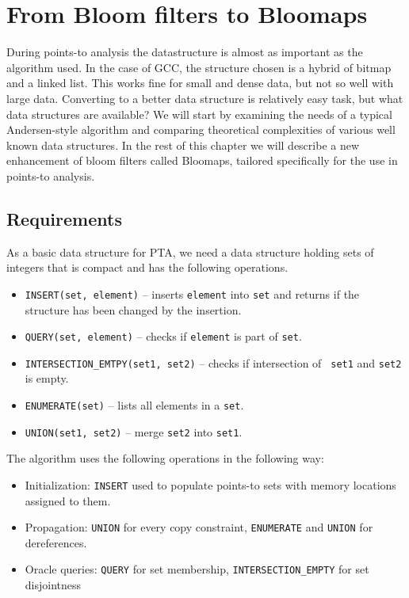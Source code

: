 \chapter{From Bloom filters to Bloomaps}

During points-to analysis the datastructure is almost as important as the
algorithm used. In the case of GCC, the structure chosen is a hybrid of bitmap
and a linked list. This works fine for small and dense data, but not so well
with large data. Converting to a better data structure is relatively easy task, but what data
structures are available? We will start by examining the needs of a typical
Andersen-style algorithm and comparing theoretical complexities of various well
known data structures. In the rest of this chapter we will describe a new
enhancement of bloom filters called Bloomaps, tailored specifically for the use
in points-to analysis.

\section{Requirements}

As a basic data structure for PTA, we need a data structure holding sets of
integers that is compact and has the following operations.

\begin{itemize}
	\item {\tt INSERT(set, element)} -- inserts {\tt element} into {\tt set} and returns if
		the structure has been changed by the insertion.
	\item {\tt QUERY(set, element)} -- checks if {\tt element} is part of {\tt set}.
	\item {\tt INTERSECTION\_EMTPY(set1, set2)} -- checks if intersection of {\tt
		set1} and {\tt set2} is empty.
	\item {\tt ENUMERATE(set)} -- lists all elements in a {\tt set}.
	\item {\tt UNION(set1, set2)} -- merge {\tt set2} into {\tt set1}.
\end{itemize}

The algorithm uses the following operations in the following way:

\begin{itemize}
	\item Initialization: {\tt INSERT} used to populate points-to sets with
		memory locations assigned to them.
	\item Propagation: {\tt UNION} for every copy constraint, {\tt ENUMERATE} and
		{\tt UNION} for dereferences.
	\item Oracle queries: {\tt QUERY} for set membership, {\tt INTERSECTION\_EMPTY}
		for set disjointness
\end{itemize}

